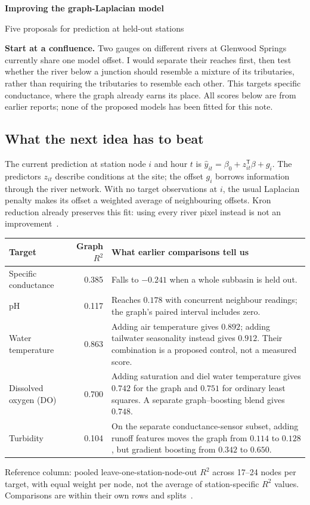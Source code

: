 \documentclass[11pt,letterpaper]{article}
\newcommand{\kicker}[1]{\noindent{\small\sffamily\bfseries\color{river}#1}\par\smallskip}
\begin{document}
\kicker{TDA LAB\quad /\quad COLORADO RIVER WATER QUALITY}
{\LARGE\bfseries Improving the graph-Laplacian model\par}
\vspace{3pt}
{\large Five proposals for prediction at held-out stations\par}
\medskip

\textbf{Start at a confluence.} Two gauges on different rivers at Glenwood Springs currently share one model offset. I would separate their reaches first, then test whether the river below a junction should resemble a mixture of its tributaries, rather than requiring the tributaries to resemble each other. This targets specific conductance, where the graph already earns its place. All scores below are from earlier reports; none of the proposed models has been fitted for this note.

\subsection*{What the next idea has to beat}
The current prediction at station node $i$ and hour $t$ is $\hat y_{it}=\beta_0+z_{it}^{\mathsf T}\beta+g_i$. The predictors $z_{it}$ describe conditions at the site; the offset $g_i$ borrows information through the river network. With no target observations at $i$, the usual Laplacian penalty makes its offset a weighted average of neighbouring offsets. Kron reduction already preserves this fit: using every river pixel instead is not an improvement~\cite{main,notes}.

{\small\renewcommand{\arraystretch}{1.18}
\begin{tabularx}{\linewidth}{@{}l r >{\raggedright\arraybackslash}X@{}}
\toprule
Target & Graph $R^2$ & What earlier comparisons tell us \\ \midrule
Specific conductance & 0.385 & Falls to $-0.241$ when a whole subbasin is held out. \\
pH & 0.117 & Reaches $0.178$ with concurrent neighbour readings; the graph's paired interval includes zero. \\
Water temperature & 0.863 & Adding air temperature gives $0.892$; adding tailwater seasonality instead gives $0.912$. Their combination is a proposed control, not a measured score. \\
Dissolved oxygen (DO) & 0.700 & Adding saturation and diel water temperature gives $0.742$ for the graph and $0.751$ for ordinary least squares. A separate graph--boosting blend gives $0.748$. \\
Turbidity & 0.104 & On the separate conductance-sensor subset, adding runoff features moves the graph from $0.114$ to $0.128$, but gradient boosting from $0.342$ to $0.650$. \\
\bottomrule
\end{tabularx}\par}
{\footnotesize Reference column: pooled leave-one-station-node-out $R^2$ across 17--24 nodes per target, with equal weight per node, not the average of station-specific $R^2$ values. Comparisons are within their own rows and splits~\cite{main,experiments,notes}.}
\end{document}
